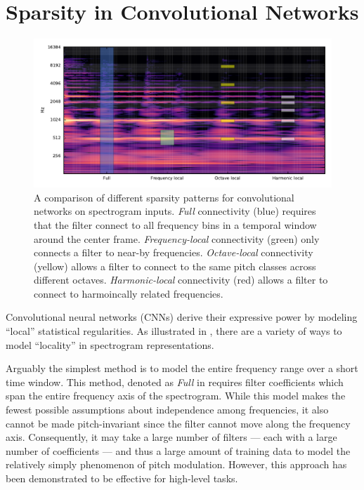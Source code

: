 \documentclass{article}
\begin{document}
\section{Sparsity in Convolutional Networks}\label{sec:page_size}


\begin{figure}
    \includegraphics[width=\columnwidth]{figs/filter-shapes}
    \caption{A comparison of different sparsity patterns for convolutional networks on spectrogram inputs.
        \emph{Full} connectivity (blue) requires that the filter connect to all frequency bins in a temporal window around the center frame.
        \emph{Frequency-local} connectivity (green) only connects a filter to near-by frequencies.
        \emph{Octave-local} connectivity (yellow) allows a filter to connect to the same pitch classes across different octaves.
        \emph{Harmonic-local} connectivity (red) allows a filter to connect to harmoincally related frequencies.}
\label{figs:filter-shapes}
\end{figure}
Convolutional neural networks (CNNs) derive their expressive power by modeling ``local'' statistical regularities.
As illustrated in , there are a variety of ways to model ``locality'' in spectrogram representations.

Arguably the simplest method is to model the entire frequency range over a short time window.  
This method, denoted as \emph{Full} in  requires filter coefficients which span the entire frequency axis of the spectrogram.
While this model makes the fewest possible assumptions about independence among frequencies, it also cannot be made pitch-invariant since the filter cannot move along the frequency axis.
Consequently, it may take a large number of filters --- each with a large number of coefficients --- and thus a large amount of training data to model the relatively simply phenomenon of pitch modulation.
However, this approach has been demonstrated to be effective for high-level tasks. %
\end{document}
